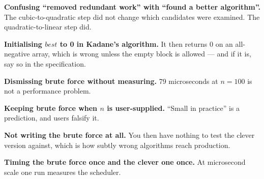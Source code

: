 \begin{pitfall}
\begin{tight}
  \item \textbf{Confusing ``removed redundant work'' with ``found a better
        algorithm''.} The cubic-to-quadratic step did not change which
        candidates were examined. The quadratic-to-linear step did.
  \item \textbf{Initialising $\mathit{best}$ to 0 in Kadane's algorithm.} It
        then returns 0 on an all-negative array, which is wrong unless the
        empty block is allowed --- and if it is, say so in the specification.
  \item \textbf{Dismissing brute force without measuring.} 79 microseconds at
        $n = 100$ is not a performance problem.
  \item \textbf{Keeping brute force when $n$ is user-supplied.} ``Small in
        practice'' is a prediction, and users falsify it.
  \item \textbf{Not writing the brute force at all.} You then have nothing to
        test the clever version against, which is how subtly wrong algorithms
        reach production.
  \item \textbf{Timing the brute force once and the clever one once.} At
        microsecond scale one run measures the scheduler.
\end{tight}
\end{pitfall}


